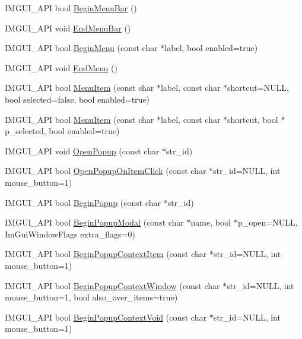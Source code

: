 \begin{DoxyCompactItemize}
I\+M\+G\+U\+I\+\_\+\+A\+PI bool \hyperlink{namespace_im_gui_a4852dff802922163fc747e2e0df5b88f}{Begin\+Menu\+Bar} ()
\item 
I\+M\+G\+U\+I\+\_\+\+A\+PI void \hyperlink{namespace_im_gui_aa226265c140eb6ee375c5b9abc69c4fc}{End\+Menu\+Bar} ()
\item 
I\+M\+G\+U\+I\+\_\+\+A\+PI bool \hyperlink{namespace_im_gui_a1e55711a21f97d5dff919d697d3a7201}{Begin\+Menu} (const char $\ast$label, bool enabled=true)
\item 
I\+M\+G\+U\+I\+\_\+\+A\+PI void \hyperlink{namespace_im_gui_a1448a5a4e8c431c15f991e9255c0df95}{End\+Menu} ()
\item 
I\+M\+G\+U\+I\+\_\+\+A\+PI bool \hyperlink{namespace_im_gui_aa1bae511ca47478998693a9d8c84f2e6}{Menu\+Item} (const char $\ast$label, const char $\ast$shortcut=N\+U\+LL, bool selected=false, bool enabled=true)
\item 
I\+M\+G\+U\+I\+\_\+\+A\+PI bool \hyperlink{namespace_im_gui_a237e76bff3088f1c2622f4aebae2356e}{Menu\+Item} (const char $\ast$label, const char $\ast$shortcut, bool $\ast$p\+\_\+selected, bool enabled=true)
\item 
I\+M\+G\+U\+I\+\_\+\+A\+PI void \hyperlink{namespace_im_gui_a9576648c40b92f54b671e2e51654dd2c}{Open\+Popup} (const char $\ast$str\+\_\+id)
\item 
I\+M\+G\+U\+I\+\_\+\+A\+PI bool \hyperlink{namespace_im_gui_a546fc46d8f510cb17a2f272891e2f5b3}{Open\+Popup\+On\+Item\+Click} (const char $\ast$str\+\_\+id=N\+U\+LL, int mouse\+\_\+button=1)
\item 
I\+M\+G\+U\+I\+\_\+\+A\+PI bool \hyperlink{namespace_im_gui_ab71527de4b52ff970e5396040302e134}{Begin\+Popup} (const char $\ast$str\+\_\+id)
\item 
I\+M\+G\+U\+I\+\_\+\+A\+PI bool \hyperlink{namespace_im_gui_aa70aaf1dacf5702f85feca6f729a307a}{Begin\+Popup\+Modal} (const char $\ast$name, bool $\ast$p\+\_\+open=N\+U\+LL, Im\+Gui\+Window\+Flags extra\+\_\+flags=0)
\item 
I\+M\+G\+U\+I\+\_\+\+A\+PI bool \hyperlink{namespace_im_gui_a579fc507f5b5d164c8fd628aee3d7bbd}{Begin\+Popup\+Context\+Item} (const char $\ast$str\+\_\+id=N\+U\+LL, int mouse\+\_\+button=1)
\item 
I\+M\+G\+U\+I\+\_\+\+A\+PI bool \hyperlink{namespace_im_gui_acf98c99f041ea341d0328e071c56411b}{Begin\+Popup\+Context\+Window} (const char $\ast$str\+\_\+id=N\+U\+LL, int mouse\+\_\+button=1, bool also\+\_\+over\+\_\+items=true)
\item 
I\+M\+G\+U\+I\+\_\+\+A\+PI bool \hyperlink{namespace_im_gui_a87a2228929503fff067d2e167a690751}{Begin\+Popup\+Context\+Void} (const char $\ast$str\+\_\+id=N\+U\+LL, int mouse\+\_\+button=1)

\end{DoxyCompactItemize}
